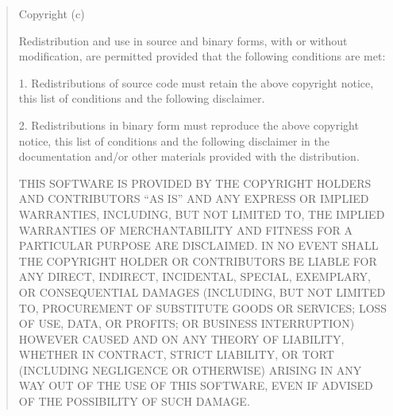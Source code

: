 \expandafter\def\csname qthesis@licensetext@BSD-2-Clause\endcsname{%
  \begin{quote}\small\raggedright
    Copyright (c) \ifstrempty{\qthesis@licenseyear}{\number\year}{\qthesis@licenseyear}\ %
    \ifstrempty{\qthesis@copyrightholder}{\qthesis@author}{\qthesis@copyrightholder}

    Redistribution and use in source and binary forms, with or without modification, are permitted provided that the following conditions are met:

    1. Redistributions of source code must retain the above copyright notice, this list of conditions and the following disclaimer.

    2. Redistributions in binary form must reproduce the above copyright notice, this list of conditions and the following disclaimer in the documentation and/or other materials provided with the distribution.

    THIS SOFTWARE IS PROVIDED BY THE COPYRIGHT HOLDERS AND CONTRIBUTORS ``AS IS'' AND ANY EXPRESS OR IMPLIED WARRANTIES, INCLUDING, BUT NOT LIMITED TO, THE IMPLIED WARRANTIES OF MERCHANTABILITY AND FITNESS FOR A PARTICULAR PURPOSE ARE DISCLAIMED. IN NO EVENT SHALL THE COPYRIGHT HOLDER OR CONTRIBUTORS BE LIABLE FOR ANY DIRECT, INDIRECT, INCIDENTAL, SPECIAL, EXEMPLARY, OR CONSEQUENTIAL DAMAGES (INCLUDING, BUT NOT LIMITED TO, PROCUREMENT OF SUBSTITUTE GOODS OR SERVICES; LOSS OF USE, DATA, OR PROFITS; OR BUSINESS INTERRUPTION) HOWEVER CAUSED AND ON ANY THEORY OF LIABILITY, WHETHER IN CONTRACT, STRICT LIABILITY, OR TORT (INCLUDING NEGLIGENCE OR OTHERWISE) ARISING IN ANY WAY OUT OF THE USE OF THIS SOFTWARE, EVEN IF ADVISED OF THE POSSIBILITY OF SUCH DAMAGE.
  \end{quote}%
}

